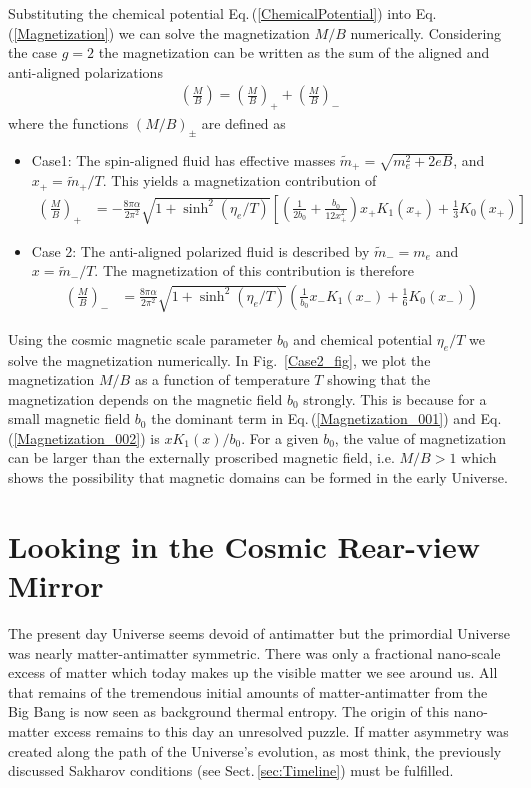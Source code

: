 \documentclass[universe,article,submit,moreauthors,pdftex,a4paper]{Definitions/mdpi}
\newcommand{\req}[1]{Eq.\,(\ref{#1})}
\newcommand*{\rf}[1]{Fig.~{\ref{#1}}}
\newcommand*{\rsec}[1]{Sect.\,{\ref{#1}}}
\begin{document}
Substituting the chemical potential \req{ChemicalPotential} into \req{Magnetization} we can solve the magnetization $M/B$ numerically.
Considering the case $g=2$ the magnetization can be written as the sum of the aligned and anti-aligned polarizations
\begin{align}
\left(\frac{M}{B}\right)=\left(\frac{M}{B}\right)_++\left(\frac{M}{B}\right)_-
\end{align}
where the functions $(M/B)_\pm$ are defined as 
\begin{itemize}
 \item Case1: The spin-aligned fluid has effective masses $\tilde m_+=\sqrt{m^2_e+2eB}$, and $x_+=\tilde m_+/T$. This yields a magnetization contribution of
\begin{align}\label{Magnetization_001}
 \left(\frac{M}{B}\right)_+&=-\frac{8\pi\alpha}{2\pi^2}\sqrt{1+\sinh^2(\eta_e/T)}\left[\left(\frac{1}{2b_0}+\frac{b_0}{12x_+^2}\right)x_+K_1(x_+)+\frac{1}{3}K_0(x_+)\right]
\end{align}
 \item Case 2: The anti-aligned polarized fluid is described by $\tilde m_-=m_e$ and $x=\tilde m_-/T$. The magnetization of this contribution is therefore
\begin{align}\label{Magnetization_002}
\left(\frac{M}{B}\right)_-&=\frac{8\pi\alpha}{2\pi^2}\sqrt{1+\sinh^2(\eta_e/T)}\left(\frac{1}{b_0}x_-K_1(x_-)+\frac{1}{6}K_0(x_-)\right)
\end{align}
\end{itemize}
Using the cosmic magnetic scale parameter $b_0$ and chemical potential $\eta_e/T$ we solve the magnetization numerically. In \rf{Case2_fig}, we plot the magnetization $M/B$ as a function of temperature $T$ showing that the magnetization depends on the magnetic field $b_0$ strongly. This is because for a small magnetic field $b_0$ the dominant term in \req{Magnetization_001} and \req{Magnetization_002} is $xK_1(x)/b_0$. For a given $b_0$, the value of magnetization can be larger than the externally proscribed magnetic field, i.e. $M/B>1$ which shows the possibility that magnetic domains can be formed in the early Universe.

\section{Looking in the Cosmic Rear-view Mirror}\label{sec:Summary}
\noindent The present day Universe seems devoid of antimatter but the primordial Universe was nearly matter-antimatter symmetric. There was only a fractional nano-scale excess of matter which today makes up the visible matter we see around us. All that remains of the tremendous initial amounts of matter-antimatter from the Big Bang is now seen as background thermal entropy. The origin of this nano-matter excess remains to this day an unresolved puzzle. If matter asymmetry was created along the path of the Universe's evolution, as most think, the previously discussed Sakharov conditions (see \rsec{sec:Timeline}) must be fulfilled.
\end{document}
